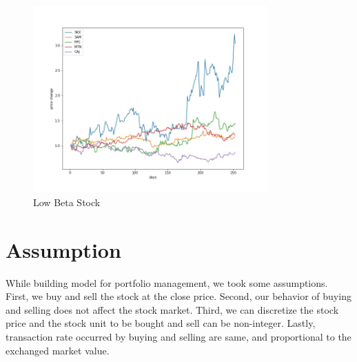 \begin{figure}[h]
\begin{center}
\includegraphics[clip, width=0.8\textwidth]{Graphics/lowbeta_pricechange.jpg} \caption{Low Beta Stock}
\end{center}
\end{figure}

\section{Assumption}
While building model for portfolio management, we took some assumptions. First, we buy and sell the stock at the close price. Second, our behavior of buying and selling does not affect the stock market. Third, we can discretize the stock price and the stock unit to be bought and sell can be non-integer. Lastly, transaction rate occurred by buying and selling are same, and proportional to the exchanged market value.	
